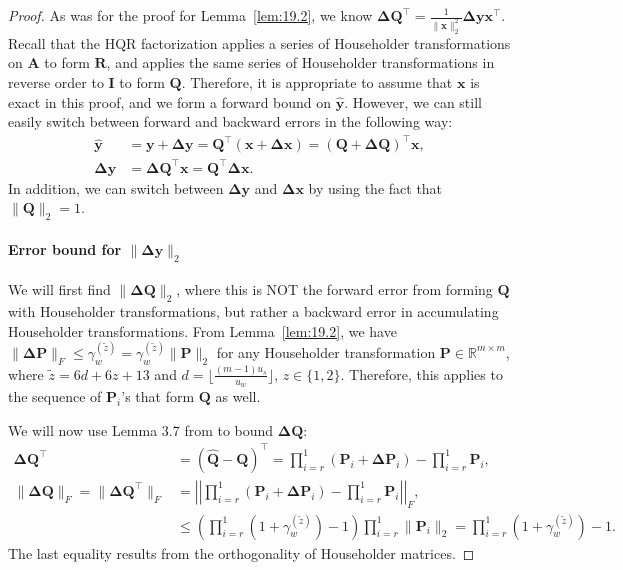 \documentclass[review,onefignum,onetabnum]{siamart190516}
\newcommand{\R}{\mathbb{R}}
\newcommand{\bb}[1]{\mathbf{#1}}
\begin{document}
\begin{proof}
	As was for the proof for Lemma~\ref{lem:19.2}, we know $\bb{\Delta Q}^{\top} = \frac{1}{\|\bb{x}\|_2^2}\bb{\Delta y}\bb{x}^{\top}$.
	Recall that the HQR factorization applies a series of Householder transformations on $\bb{A}$ to form $\bb{R}$, and applies the same series of Householder transformations in reverse order to $\bb{I}$ to form $\bb{Q}$.
	Therefore, it is appropriate to assume that $\bb{x}$ is exact in this proof, and we form a forward bound on $\hat{\bb{y}}$.
	However, we can still easily switch between forward and backward errors in the following way:
	\begin{align*}
	\hat{\bb{y}} &= \bb{y} + \bb{\Delta y} = \bb{Q}^{\top} (\bb{x}+\bb{\Delta x}) = (\bb{Q}+\bb{\Delta Q})^{\top} \bb{x},\\
	\bb{\Delta y} &= \bb{\Delta Q}^{\top} \bb{x} = \bb{Q}^{\top}\bb{\Delta x}.
	\end{align*}
	In addition, we can switch between $\bb{\Delta y}$ and $\bb{\Delta x}$ by using the fact that $\|\bb{Q}\|_2 = 1$.
	\paragraph{Error bound for $\|\bb{\Delta y}\|_2$}
	We will first find $\|\bb{\Delta Q}\|_2$, where this is NOT the forward error from forming $\bb{Q}$ with Householder transformations, but rather a backward error in accumulating Householder transformations. 
	From Lemma~\ref{lem:19.2}, we have$ \|\bb{\Delta P}\|_F\leq\gamma_w^{(\tilde{z})} = \gamma_w^{(\tilde{z})} \|\bb{P}\|_2$ for any Householder transformation $\bb{P}\in\R^{m\times m}$, where $\tilde{z} = 6d+6z+13$ and $d=\lfloor\frac{(m-1)u_s}{u_w}\rfloor$, $z\in\{1,2\}$.
	Therefore, this applies to the sequence of $\bb{P}_i$'s that form $\bb{Q}$ as well.
	
	We will now use Lemma 3.7 from \cite{Higham2002} to bound $\bb{\Delta Q}$:
	\begin{align*}
	\bb{\Delta Q}^{\top}& = \left(\hat{\bb{Q}} - \bb{Q}\right)^{\top}= \prod_{i=r}^{1}\left(\bb{P}_i +\bb{\Delta P}_i\right) - \prod_{i=r}^{1}\bb{P}_i,\\
	\|\bb{\Delta Q}\|_F = \|\bb{\Delta Q}^{\top}\|_F  &= \left|\left| \prod_{i=r}^{1}\left(\bb{P}_i +\bb{\Delta P}_i\right) - \prod_{i=r}^{1}\bb{P}_i \right|\right|_F,\\
	&\leq \left(\prod_{i=r}^1(1+\gamma_w^{(\tilde{z})})-1\right)\prod_{i=r}^1\|\bb{P}_i\|_2 = \prod_{i=r}^1(1+\gamma_w^{(\tilde{z})})-1.
	\end{align*}
	The last equality results from the orthogonality of Householder matrices.\par
	

\end{proof}
\end{document}
